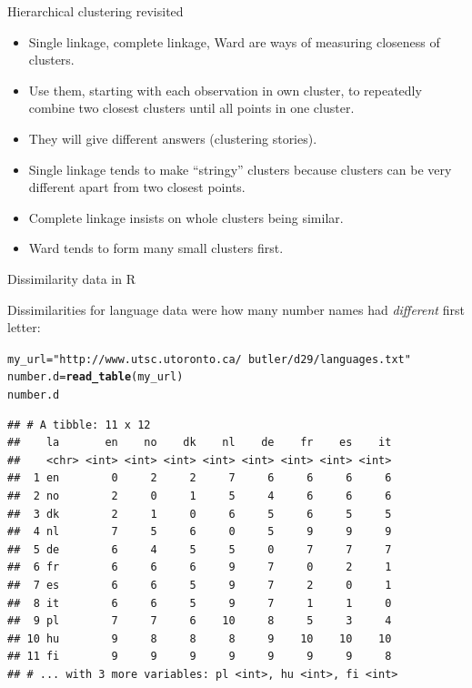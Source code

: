 \documentclass[unknownkeysallowed]{beamer}\usepackage[]{graphicx}\usepackage[]{color}
\makeatletter
\newcommand{\hlstr}[1]{\textcolor[rgb]{0.192,0.494,0.8}{#1}}%
\newcommand{\hlstd}[1]{\textcolor[rgb]{0.345,0.345,0.345}{#1}}%
\newcommand{\hlkwb}[1]{\textcolor[rgb]{0.69,0.353,0.396}{#1}}%
\newcommand{\hlkwd}[1]{\textcolor[rgb]{0.737,0.353,0.396}{\textbf{#1}}}%
\newenvironment{kframe}{%
 \def\at@end@of@kframe{}%
 \ifinner\ifhmode%
  \def\at@end@of@kframe{\end{minipage}}%
  \begin{minipage}{\columnwidth}%
 \fi\fi%
 \def\FrameCommand##1{\hskip\@totalleftmargin \hskip-\fboxsep
 \colorbox{shadecolor}{##1}\hskip-\fboxsep
     \hskip-\linewidth \hskip-\@totalleftmargin \hskip\columnwidth}%
 \MakeFramed {\advance\hsize-\width
   \@totalleftmargin\z@ \linewidth\hsize
   \@setminipage}}%
 {\par\unskip\endMakeFramed%
 \at@end@of@kframe}
\newenvironment{knitrout}{}{} %
\makeatother
\begin{document}
\begin{frame}[fragile]{Hierarchical clustering revisited}
  
  \begin{itemize}
  \item Single linkage, complete linkage, Ward are ways of measuring
    closeness of clusters.
  \item Use them, starting with each observation in own cluster, to
    repeatedly combine two closest clusters until all points in one
    cluster.
  \item They will give different answers (clustering stories). 
  \item Single linkage tends to make ``stringy'' clusters because
    clusters can be very different apart from two closest points.
  \item Complete linkage insists on whole clusters being similar.
  \item Ward tends to form many small clusters first.
  \end{itemize}
  
\end{frame}

\begin{frame}[fragile]{Dissimilarity data in R}


Dissimilarities for language data\label{p:numberd} were how many
number names had \emph{different} first letter:



\begin{knitrout}\scriptsize
{}\color{fgcolor}\begin{kframe}
\begin{alltt}
\hlstd{my_url}\hlkwb{=}\hlstr{"http://www.utsc.utoronto.ca/~butler/d29/languages.txt"}
\hlstd{number.d}\hlkwb{=}\hlkwd{read_table}\hlstd{(my_url)}
\hlstd{number.d}
\end{alltt}
\begin{verbatim}
## # A tibble: 11 x 12
##    la       en    no    dk    nl    de    fr    es    it
##    <chr> <int> <int> <int> <int> <int> <int> <int> <int>
##  1 en        0     2     2     7     6     6     6     6
##  2 no        2     0     1     5     4     6     6     6
##  3 dk        2     1     0     6     5     6     5     5
##  4 nl        7     5     6     0     5     9     9     9
##  5 de        6     4     5     5     0     7     7     7
##  6 fr        6     6     6     9     7     0     2     1
##  7 es        6     6     5     9     7     2     0     1
##  8 it        6     6     5     9     7     1     1     0
##  9 pl        7     7     6    10     8     5     3     4
## 10 hu        9     8     8     8     9    10    10    10
## 11 fi        9     9     9     9     9     9     9     8
## # ... with 3 more variables: pl <int>, hu <int>, fi <int>
\end{verbatim}
\end{kframe}
\end{knitrout}

\end{frame}
\end{document}
